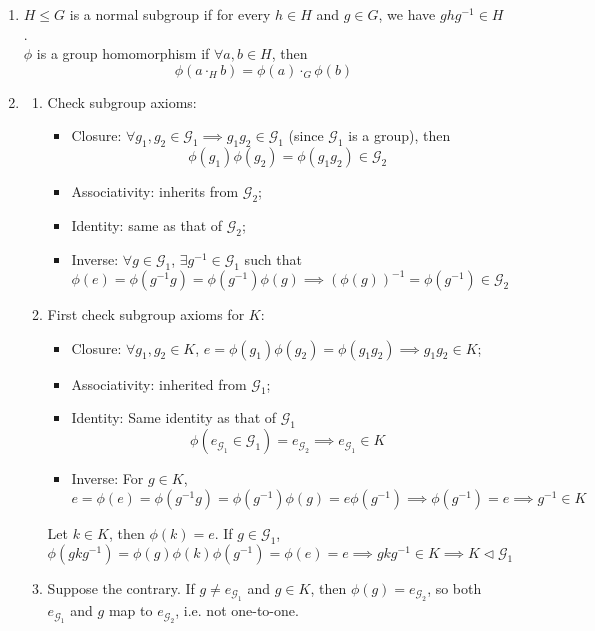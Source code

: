 \documentclass[a4paper]{article}
\begin{document}
\begin{ans}\leavevmode
\begin{enumerate}[label=(\roman*)]
\item $H\leq G$ is a normal subgroup if for every $h\in H$ and $g\in G$, we have $ghg^{-1}\in H$.\\[5pt]
$\phi$ is a group homomorphism if $\forall a,b\in H$, then
$$\phi(a\cdot_H b)=\phi(a)\cdot_G\phi(b)$$
\item 
\begin{enumerate}[label=(\alph*)]
\item Check subgroup axioms:
\begin{itemize}
    \item Closure: $\forall g_1,g_2\in \mathcal{G}_1\implies g_1g_2\in\mathcal{G}_1$ (since $\mathcal{G}_1$ is a group), then $$\phi(g_1)\phi(g_2)=\phi(g_1g_2)\in \mathcal{G}_2$$
    \item Associativity: inherits from $\mathcal{G}_2$;
    \item Identity: same as that of $\mathcal{G}_2$;
    \item Inverse: $\forall g\in\mathcal{G}_1$, $\exists g^{-1}\in\mathcal{G}_1$ such that
    $$\phi(e)=\phi(g^{-1}g)=\phi(g^{-1})\phi(g)\implies(\phi(g))^{-1}=\phi(g^{-1})\in\mathcal{G}_2$$
\end{itemize}
\item First check subgroup axioms for $K$:
\begin{itemize}
    \item Closure: $\forall g_1,g_2\in K$, $e=\phi(g_1)\phi(g_2)=\phi(g_1g_2)\implies g_1g_2\in K$;
    \item Associativity: inherited from $\mathcal{G}_1$;
    \item Identity: Same identity as that of $\mathcal{G}_1$ $$\phi(e_{\mathcal{G}_1}\in\mathcal{G}_1)=e_{\mathcal{G}_2}\implies e_{\mathcal{G}_1}\in K$$
    \item Inverse: For $g\in K$,
    $$e=\phi(e)=\phi(g^{-1}g)=\phi(g^{-1})\phi(g)=e\phi(g^{-1})\implies\phi(g^{-1})=e\implies g^{-1}\in K$$
\end{itemize}
Let $k\in K$, then $\phi(k)=e$. If $g\in\mathcal{G}_1$,
$$\phi(gkg^{-1})=\phi(g)\phi(k)\phi(g^{-1})=\phi(e)=e\implies gkg^{-1}\in K\implies K\lhd\mathcal{G}_1$$
\item Suppose the contrary. If $g\neq e_{\mathcal{G}_1}$ and $g\in K$, then $\phi(g)=e_{\mathcal{G}_2}$, so both $e_{\mathcal{G}_1}$ and $g$ map to $e_{\mathcal{G}_2}$, i.e. not one-to-one.
\end{enumerate}

\end{enumerate}
\end{ans}
\end{document}
